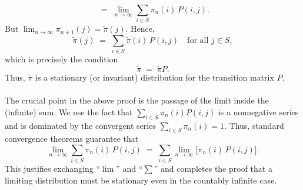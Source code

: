 \documentclass{article}
\begin{document}
{\[  \;=\;
  \lim_{n \to \infty} \sum_{i \in S} \pi_n(i)\,P(i,j).
\]
But \(\lim_{n \to \infty} \pi_{n+1}(j) = \tilde{\pi}(j)\).  Hence,
\[
  \tilde{\pi}(j) 
  \;=\;
  \sum_{i \in S} \tilde{\pi}(i)\,P(i,j)
  \quad \text{for all } j \in S,
\]
which is precisely the condition
\[
  \tilde{\pi} \;=\; \tilde{\pi}P.
\]
Thus, \(\tilde{\pi}\) is a stationary (or invariant) distribution for the
transition matrix \(P\). \\ \\
The crucial point in the above proof is the passage of the limit inside the
(infinite) sum.  We use the fact that
\(\sum_{i \in S} \pi_n(i) P(i,j)\) is a nonnegative series and is dominated
by the convergent series \(\sum_{i \in S} \pi_n(i)=1\).  Thus, standard
convergence theorems guarantee that
\[
   \lim_{n \to \infty}
   \sum_{i \in S} \pi_n(i)\,P(i,j)
   \;=\;
   \sum_{i \in S} \lim_{n \to \infty} \bigl[\pi_n(i)\,P(i,j)\bigr].
\]
This justifies exchanging ``\(\lim\)'' and ``\(\sum\)'' and completes the
proof that a limiting distribution must be stationary even in the
countably infinite case.}

%
%
\end{document}
